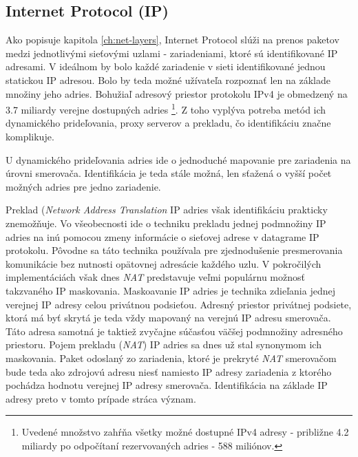 \documentclass[
  printed, %
  table,   %
  lof,     %
  lot,     %
]{fithesis3}
\begin{document}
\subsection{Internet Protocol (IP)}
Ako popisuje kapitola \ref{ch:net-layers}, Internet Protocol slúži na prenos
paketov medzi jednotlivými sieťovými uzlami - zariadeniami, ktoré sú
identifikované IP adresami. V ideálnom by bolo každé zariadenie v sieti
identifikované jednou statickou IP adresou. Bolo by teda možné užívateľa
rozpoznať len na základe množiny jeho adries. Bohužiaľ adresový priestor
protokolu IPv4 je obmedzený na 3.7 miliardy verejne dostupných adries
\footnote{
  Uvedené množstvo zahŕňa všetky možné dostupné IPv4 adresy - približne 4.2
  miliardy po odpočítaní rezervovaných adries - 588 miliónov.
}.
Z toho vyplýva potreba metód ich dynamického prideľovania, proxy serverov a
prekladu, čo identifikáciu značne komplikuje.

U dynamického prideľovania adries ide o jednoduché mapovanie pre zariadenia
na úrovni smerovača. Identifikácia je teda stále možná, len sťažená o vyšší
počet možných adries pre jedno zariadenie.

Preklad (\textit{Network Address Translation} IP adries však identifikáciu
prakticky znemožňuje. Vo všeobecnosti ide o techniku prekladu jednej podmnožiny
IP adries na inú pomocou zmeny informácie o sieťovej adrese v datagrame IP
protokolu. Pôvodne sa táto technika používala pre zjednodušenie presmerovania
komunikácie bez nutnosti opätovnej adresácie každého uzlu. V pokročilých
implementáciách však dnes \textit{NAT} predstavuje veľmi populárnu možnosť
takzvaného  IP maskovania. Maskoavanie IP adries je technika zdieľania jednej
verejnej IP adresy celou privátnou podsieťou. Adresný priestor privátnej
podsiete, ktorá má byť skrytá je teda vždy mapovaný na verejnú IP adresu
smerovača. Táto adresa samotná je taktiež zvyčajne súčasťou väčšej podmnožiny
adresného priestoru. Pojem prekladu (\textit{NAT}) IP adries sa dnes už stal
synonymom ich maskovania. Paket odoslaný zo zariadenia, ktoré je prekryté
\textit{NAT} smerovačom bude teda ako zdrojovú adresu niesť namiesto IP adresy
zariadenia z ktorého pochádza hodnotu verejnej IP adresy smerovača.
Identifikácia na základe IP adresy preto v tomto prípade stráca význam.
\end{document}
